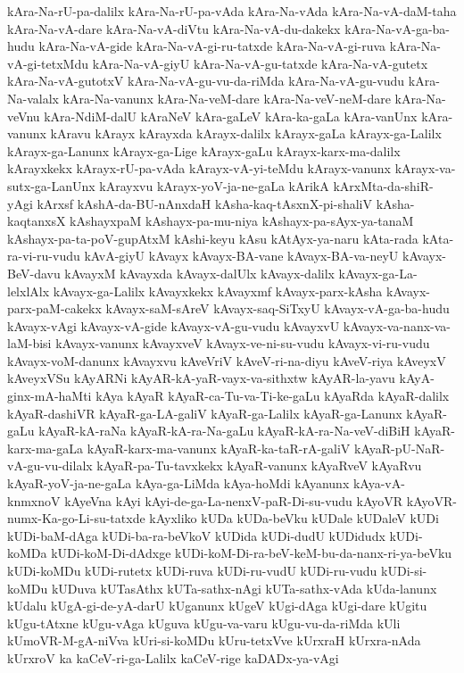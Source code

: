 {kAra-Na-rU-pa-dalilx
kAra-Na-rU-pa-vAda
kAra-Na-vAda
kAra-Na-vA-daM-taha
kAra-Na-vA-dare
kAra-Na-vA-diVtu
kAra-Na-vA-du-dakekx
kAra-Na-vA-ga-ba-hudu
kAra-Na-vA-gide
kAra-Na-vA-gi-ru-tatxde
kAra-Na-vA-gi-ruva
kAra-Na-vA-gi-tetxMdu
kAra-Na-vA-giyU
kAra-Na-vA-gu-tatxde
kAra-Na-vA-gutetx
kAra-Na-vA-gutotxV
kAra-Na-vA-gu-vu-da-riMda
kAra-Na-vA-gu-vudu
kAra-Na-valalx
kAra-Na-vanunx
kAra-Na-veM-dare
kAra-Na-veV-neM-dare
kAra-Na-veVnu
kAra-NdiM-dalU
kAraNeV
kAra-gaLeV
kAra-ka-gaLa
kAra-vanUnx
kAra-vanunx
kAravu
kArayx
kArayxda
kArayx-dalilx
kArayx-gaLa
kArayx-ga-Lalilx
kArayx-ga-Lanunx
kArayx-ga-Lige
kArayx-gaLu
kArayx-karx-ma-dalilx
kArayxkekx
kArayx-rU-pa-vAda
kArayx-vA-yi-teMdu
kArayx-vanunx
kArayx-va-sutx-ga-LanUnx
kArayxvu
kArayx-yoV-ja-ne-gaLa
kArikA
kArxMta-da-shiR-yAgi
kArxsf
kAshA-da-BU-nAnxdaH
kAsha-kaq-tAsxnX-pi-shaliV
kAsha-kaqtanxsX
kAshayxpaM
kAshayx-pa-mu-niya
kAshayx-pa-sAyx-ya-tanaM
kAshayx-pa-ta-poV-gupAtxM
kAshi-keyu
kAsu
kAtAyx-ya-naru
kAta-rada
kAta-ra-vi-ru-vudu
kAvA-giyU
kAvayx
kAvayx-BA-vane
kAvayx-BA-va-neyU
kAvayx-BeV-davu
kAvayxM
kAvayxda
kAvayx-dalUlx
kAvayx-dalilx
kAvayx-ga-La-lelxlAlx
kAvayx-ga-Lalilx
kAvayxkekx
kAvayxmf
kAvayx-parx-kAsha
kAvayx-parx-paM-cakekx
kAvayx-saM-sAreV
kAvayx-saq-SiTxyU
kAvayx-vA-ga-ba-hudu
kAvayx-vAgi
kAvayx-vA-gide
kAvayx-vA-gu-vudu
kAvayxvU
kAvayx-va-nanx-va-laM-bisi
kAvayx-vanunx
kAvayxveV
kAvayx-ve-ni-su-vudu
kAvayx-vi-ru-vudu
kAvayx-voM-danunx
kAvayxvu
kAveVriV
kAveV-ri-na-diyu
kAveV-riya
kAveyxV
kAveyxVSu
kAyARNi
kAyAR-kA-yaR-vayx-va-sithxtw
kAyAR-la-yavu
kAyA-ginx-mA-haMti
kAya
kAyaR
kAyaR-ca-Tu-va-Ti-ke-gaLu
kAyaRda
kAyaR-dalilx
kAyaR-dashiVR
kAyaR-ga-LA-galiV
kAyaR-ga-Lalilx
kAyaR-ga-Lanunx
kAyaR-gaLu
kAyaR-kA-raNa
kAyaR-kA-ra-Na-gaLu
kAyaR-kA-ra-Na-veV-diBiH
kAyaR-karx-ma-gaLa
kAyaR-karx-ma-vanunx
kAyaR-ka-taR-rA-galiV
kAyaR-pU-NaR-vA-gu-vu-dilalx
kAyaR-pa-Tu-tavxkekx
kAyaR-vanunx
kAyaRveV
kAyaRvu
kAyaR-yoV-ja-ne-gaLa
kAya-ga-LiMda
kAya-hoMdi
kAyanunx
kAya-vA-knmxnoV
kAyeVna
kAyi
kAyi-de-ga-La-nenxV-paR-Di-su-vudu
kAyoVR
kAyoVR-numx-Ka-go-Li-su-tatxde
kAyxliko
kUDa
kUDa-beVku
kUDale
kUDaleV
kUDi
kUDi-baM-dAga
kUDi-ba-ra-beVkoV
kUDida
kUDi-dudU
kUDidudx
kUDi-koMDa
kUDi-koM-Di-dAdxge
kUDi-koM-Di-ra-beV-keM-bu-da-nanx-ri-ya-beVku
kUDi-koMDu
kUDi-rutetx
kUDi-ruva
kUDi-ru-vudU
kUDi-ru-vudu
kUDi-si-koMDu
kUDuva
kUTasAthx
kUTa-sathx-nAgi
kUTa-sathx-vAda
kUda-lanunx
kUdalu
kUgA-gi-de-yA-darU
kUganunx
kUgeV
kUgi-dAga
kUgi-dare
kUgitu
kUgu-tAtxne
kUgu-vAga
kUguva
kUgu-va-varu
kUgu-vu-da-riMda
kUli
kUmoVR-M-gA-niVva
kUri-si-koMDu
kUru-tetxVve
kUrxraH
kUrxra-nAda
kUrxroV
ka
kaCeV-ri-ga-Lalilx
kaCeV-rige
kaDADx-ya-vAgi
}
